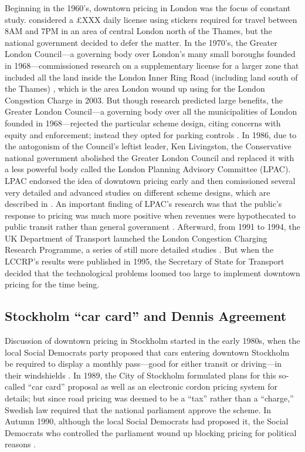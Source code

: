 Beginning in the 1960's, downtown pricing in London was the focus of constant study. \citet{Thomson1967a} considered a \pounds XXX daily license using stickers required for travel between 8AM and 7PM in an area of central London north of the Thames, but the national government decided to defer the matter. In the 1970's, the Greater London Council---a governing body over London's many small boroughs founded in 1968---commissioned research on a supplementary license for a larger zone that included all the land inside the London Inner Ring Road (including land south of the Thames) \citep{may1975}, which is the area London wound up using for the London Congestion Charge in 2003. But though research predicted large benefits, the Greater London Council---a governing body over all the municipalities of London founded in 1968---rejected the particular scheme design, citing concerns with equity and enforcement; instead they opted for parking controls \citep{Richards2006}. In 1986, due to the antogonism of the Council's leftist leader, Ken Livingston, the Conservative national government abolished the Greater London Council and replaced it with a less powerful body called the London Planning Advisory Committee (LPAC). LPAC endorsed the idea of downtown pricing early and then comissioned several very detailed and advanced studies on different scheme designs, which are described in \citet[p. 51-54]{Gomez-Ibanez1994}. An important finding of LPAC's research was that the public's response to pricing was much more positive when revenues were hypothecated to public transit rather than general government \citet[p. 51]{Richards2006}. Afterward, from 1991 to 1994, the UK Department of Transport launched the London Congestion Charging Research Programme, a series of still more detailed studies \citep{MVA1995,Richards1996}. But when the LCCRP's results were published in 1995, the Secretary of State for Transport decided that the technological problems loomed too large to implement downtown pricing for the time being.

 \subsection{Stockholm ``car card'' and Dennis Agreement}

Discussion of downtown pricing in Stockholm started in the early 1980s, when the local Social Democrats party proposed that cars entering downtown Stockholm be required to display a monthly pass---good for either transit or driving---in their windshields \citep{GullbergIsaksson2009,Arnott2005}. In 1989, the City of Stockholm formulated plans for this so-called ``car card'' proposal as well as an electronic cordon pricing system \citet[p. 90]{Hau1992} for details; but since road pricing was deemed to be a ``tax'' rather than a ``charge,'' Swedish law required that the national parliament approve the scheme. In Autumn 1990, although the local Social Democrats had proposed it, the Social Democrats who controlled the parliament wound up blocking pricing for political reasons \citep{Ahlstrand2001}. 

